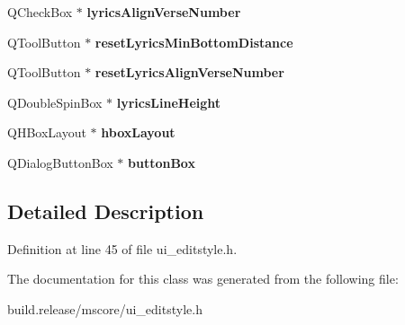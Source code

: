 \begin{DoxyCompactItemize}
\mbox{\label{class_ui___edit_style_base_a7e463810d1e798b2c3128b21b9fdbe81}} 
Q\+Check\+Box $\ast$ {\bfseries lyrics\+Align\+Verse\+Number}
\item 
\mbox{\label{class_ui___edit_style_base_a39de4aecad015b33e9c0d315ef0acfdf}} 
Q\+Tool\+Button $\ast$ {\bfseries reset\+Lyrics\+Min\+Bottom\+Distance}
\item 
\mbox{\label{class_ui___edit_style_base_adec6ad5d2ab7ec619505d8e4534d04f5}} 
Q\+Tool\+Button $\ast$ {\bfseries reset\+Lyrics\+Align\+Verse\+Number}
\item 
\mbox{\label{class_ui___edit_style_base_ad8a4b81c75adf4f8197f33e3b3ddd5b4}} 
Q\+Double\+Spin\+Box $\ast$ {\bfseries lyrics\+Line\+Height}
\item 
\mbox{\label{class_ui___edit_style_base_a7fdd3b654d8a9bef8deb7d6b24828fad}} 
Q\+H\+Box\+Layout $\ast$ {\bfseries hbox\+Layout}
\item 
\mbox{\label{class_ui___edit_style_base_ac0faa8414afc5581e88c125426add39e}} 
Q\+Dialog\+Button\+Box $\ast$ {\bfseries button\+Box}
\end{DoxyCompactItemize}


\subsection{Detailed Description}


Definition at line 45 of file ui\+\_\+editstyle.\+h.



The documentation for this class was generated from the following file\+:\begin{DoxyCompactItemize}
\item 
build.\+release/mscore/ui\+\_\+editstyle.\+h\end{DoxyCompactItemize}
